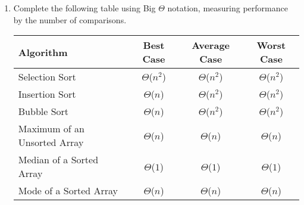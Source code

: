 \documentclass[11pt]{article}
\begin{document}
\begin{enumerate}[leftmargin=*]
    \pagebreak
    \item Complete the following table using Big $\Theta$ notation, measuring performance by the number of comparisons.
    \begin{center}
        \begin{tabular}{l | c | c | c }
            Algorithm & Best Case & Average Case & Worst Case \\ \hline
            Selection Sort & $\Theta$($n^2$) & $\Theta$($n^2$) & $\Theta$($n^2$) \\ \hline
            Insertion Sort & $\Theta$($n$) & $\Theta$($n^2$) & $\Theta$($n^2$)\\ \hline
            Bubble Sort & $\Theta$($n$) & $\Theta$($n^2$) & $\Theta$($n^2$) \\ \hline
            Maximum of an Unsorted Array & $\Theta$($n$) & $\Theta$($n$) & $\Theta$($n$) \\ \hline
            Median of a Sorted Array & $\Theta$($1$) & $\Theta$($1$) & $\Theta$($1$) \\ \hline
            Mode of a Sorted Array & $\Theta$($n$) & $\Theta$($n$) & $\Theta$($n$) \\ \hline
        \end{tabular}
    \end{center}
    

\end{enumerate}
\end{document}
